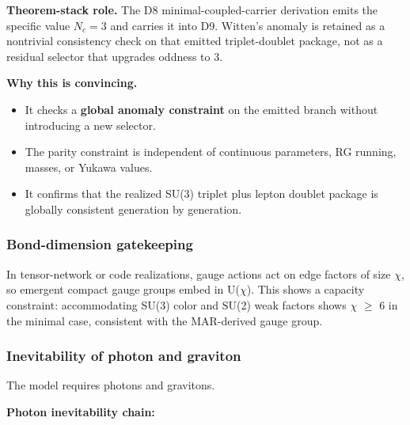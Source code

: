 \textbf{Theorem-stack role.} The D8 minimal-coupled-carrier derivation emits the specific value \(N_c=3\) and carries it into D9. Witten's anomaly is retained as a nontrivial consistency check on that emitted triplet-doublet package, not as a residual selector that upgrades oddness to \(3\).

\textbf{Why this is convincing.}

\begin{itemize}
\tightlist
\item
  It checks a \textbf{global anomaly constraint} on the emitted branch without introducing a new selector.
\item
  The parity constraint is independent of continuous parameters, RG running, masses, or Yukawa values.
\item
  It confirms that the realized SU(3) triplet plus lepton doublet package is globally consistent generation by generation.
\end{itemize}

\subsubsection{Bond-dimension gatekeeping}\label{610-bond-dimension-gatekeeping}

In tensor-network or code realizations, gauge actions act on edge factors of size \ensuremath{\chi}, so emergent compact gauge groups embed in U(\ensuremath{\chi}). This shows a capacity constraint: accommodating SU(3) color and SU(2) weak factors shows \ensuremath{\chi} \ensuremath{\geq} 6 in the minimal case, consistent with the MAR-derived gauge group.

\subsubsection{Inevitability of photon and graviton}\label{611-inevitability-of-photon-and-graviton}

The model requires photons and gravitons.

\textbf{Photon inevitability chain:}

